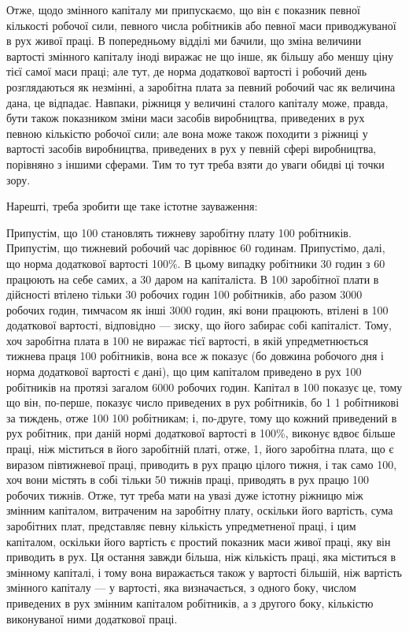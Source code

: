 Отже, щодо змінного капіталу ми припускаємо, що він є показник
певної кількості робочої сили, певного числа робітників
або певної маси приводжуваної в рух живої праці. В попередньому
відділі ми бачили, що зміна величини вартості змінного
капіталу іноді виражає не що інше, як більшу або меншу ціну
тієї самої маси праці; але тут, де норма додаткової вартості
і робочий день розглядаються як незмінні, а заробітна плата
за певний робочий час як величина дана, це відпадає. Навпаки,
ріжниця у величині сталого капіталу може, правда, бути також
показником зміни маси засобів виробництва, приведених в рух
певною кількістю робочої сили; але вона може також походити
з ріжниці у вартості засобів виробництва, приведених в рух
у певній сфері виробництва, порівняно з іншими сферами. Тим
то тут треба взяти до уваги обидві ці точки зору.

Нарешті, треба зробити ще таке істотне зауваження:

Припустім, що 100 становлять тижневу
заробітну плату 100 робітників. Припустім, що тижневий робочий час дорівнює 60 годинам. Припустімо,
далі, що норма
додаткової вартості \deq{} 100\%. В цьому випадку робітники 30 годин з 60 працюють на себе самих, а 30
даром на капіталіста.
В 100 заробітної плати в дійсності втілено
тільки 30 робочих годин 100 робітників, або разом 3000 робочих годин, тимчасом як інші 3000 годин,
які вони працюють,
втілені в 100 додаткової вартості, відповідно — зиску, що його забирає собі
капіталіст. Тому, хоч заробітна плата в 100 не виражає тієї вартості,
в якій упредметнюється тижнева праця 100 робітників, вона
все ж показує (бо довжина робочого дня і норма додаткової
вартості є дані), що цим капіталом приведено в рух 100 робітників на протязі загалом 6000 робочих
годин. Капітал в 100 показує це, тому що він, по-перше, показує
число приведених в рух робітників, бо 1 \deq{} 1 робітникові за тиждень, отже 100 \deq{} 100 робітникам; і, по-друге, тому що кожний приведений
в рух робітник, при даній нормі додаткової вартості в 100\%,
виконує вдвоє більше праці, ніж міститься в його заробітній
платі, отже, 1, його заробітна плата, що є виразом півтижневої праці, приводить в
рух працю цілого тижня,
і так само 100, хоч вони містять в собі тільки 50
тижнів праці, приводять в рух працю 100 робочих тижнів. Отже,
тут треба мати на увазі дуже істотну ріжницю між змінним капіталом, витраченим на заробітну плату,
оскільки його вартість,
сума заробітних плат, представляє певну кількість упредметненої праці, і цим капіталом, оскільки
його вартість є простий показник маси живої праці, яку він приводить в рух. Ця
остання завжди більша, ніж кількість праці, яка міститься
в змінному капіталі, і тому вона виражається також у вартості
більшій, ніж вартість змінного капіталу — у вартості, яка визначається, з одного боку, числом
приведених в рух змінним капіталом робітників, а з другого боку, кількістю виконуваної ними
додаткової праці.
